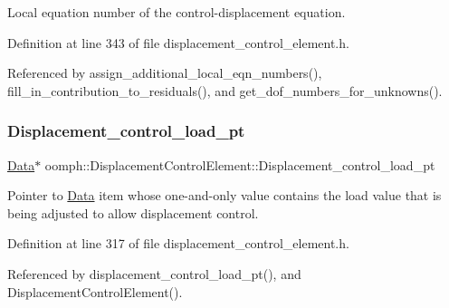 Local equation number of the control-\/displacement equation. 



Definition at line 343 of file displacement\+\_\+control\+\_\+element.\+h.



Referenced by assign\+\_\+additional\+\_\+local\+\_\+eqn\+\_\+numbers(), fill\+\_\+in\+\_\+contribution\+\_\+to\+\_\+residuals(), and get\+\_\+dof\+\_\+numbers\+\_\+for\+\_\+unknowns().

\mbox{\label{classoomph_1_1DisplacementControlElement_af63844ddb6481e7823e3612b1c18ca2c}} 
\subsubsection{\texorpdfstring{Displacement\+\_\+control\+\_\+load\+\_\+pt}{Displacement\_control\_load\_pt}}
{\footnotesize\ttfamily \hyperlink{classoomph_1_1Data}{Data}$\ast$ oomph\+::\+Displacement\+Control\+Element\+::\+Displacement\+\_\+control\+\_\+load\+\_\+pt\hspace{0.3cm}{\ttfamily [protected]}}



Pointer to \hyperlink{classoomph_1_1Data}{Data} item whose one-\/and-\/only value contains the load value that is being adjusted to allow displacement control. 



Definition at line 317 of file displacement\+\_\+control\+\_\+element.\+h.



Referenced by displacement\+\_\+control\+\_\+load\+\_\+pt(), and Displacement\+Control\+Element().

\mbox{\label{classoomph_1_1DisplacementControlElement_ac555d29e8d7bfa183b465eef8d40a761}} 
